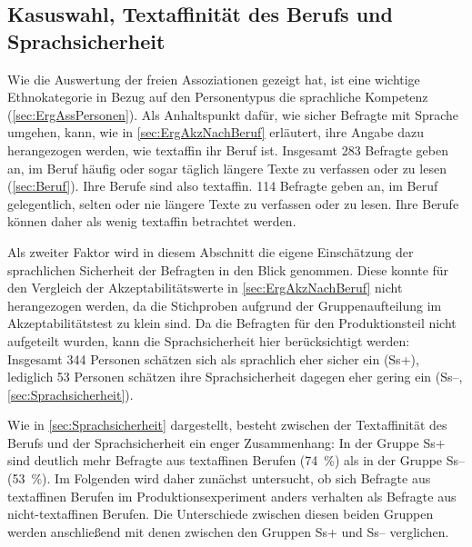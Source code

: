 \subsection{Kasuswahl, Textaffinität des Berufs und Sprachsicherheit}
\label{sec:ErgProdNachSk}
Wie die Auswertung der freien Assoziationen gezeigt hat, ist eine wichtige Ethnokategorie in Bezug auf den Personentypus die sprachliche Kompetenz (\autoref{sec:ErgAssPersonen}). 
Als Anhaltspunkt dafür, wie sicher Befragte mit Sprache umgehen, kann, wie in \autoref{sec:ErgAkzNachBeruf} erläutert, ihre Angabe dazu herangezogen werden, wie textaffin ihr Beruf ist. 
Insgesamt 283 Befragte geben an, im Beruf häufig oder sogar täglich längere Texte zu verfassen oder zu lesen (\autoref{sec:Beruf}). 
Ihre Berufe sind also textaffin. 
114 Befragte geben an, im Beruf gelegentlich, selten oder nie längere Texte zu verfassen oder zu lesen. 
Ihre Berufe können daher als wenig textaffin betrachtet werden. 

Als zweiter Faktor wird in diesem Abschnitt die eigene Einschätzung der sprachlichen Sicherheit der Befragten in den Blick genommen. 
Diese konnte für den Vergleich der Akzeptabilitätswerte in \autoref{sec:ErgAkzNachBeruf} nicht herangezogen werden, da die Stichproben aufgrund der Gruppenaufteilung im Akzeptabilitätstest zu klein sind.
Da die Befragten für den Produktionsteil nicht aufgeteilt wurden, kann die Sprachsicherheit hier berücksichtigt werden:
Insgesamt 344 Personen schätzen sich als sprachlich eher sicher ein (Ss+), lediglich 53 Personen schätzen ihre Sprachsicherheit dagegen eher gering ein (Ss--, \autoref{sec:Sprachsicherheit}). 

Wie in \autoref{sec:Sprachsicherheit} dargestellt, besteht zwischen der Textaffinität des Berufs und der Sprachsicherheit ein enger Zusammenhang: 
In der Gruppe Ss+ sind deutlich mehr Befragte aus textaffinen Berufen (74~\%) als in der Gruppe Ss-- (53~\%).  
Im Folgenden wird daher zunächst untersucht, ob sich Befragte aus textaffinen Berufen im Produktionsexperiment anders verhalten als Befragte aus nicht-textaffinen Berufen. 
Die Unterschiede zwischen diesen beiden Gruppen werden anschließend mit denen zwischen den Gruppen Ss+ und Ss-- verglichen. 

